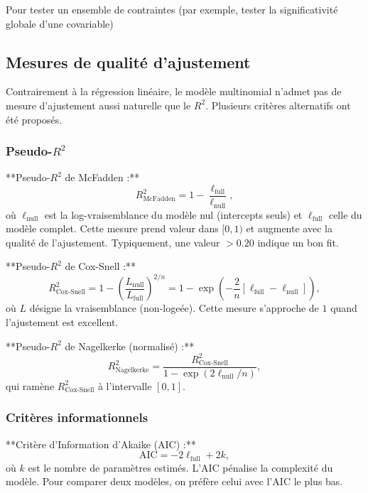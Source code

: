 \documentclass[12pt,a4paper]{article}
\begin{document}
Pour tester un ensemble de contraintes (par exemple, tester la significativité globale d'une covariable)

\subsection{Mesures de qualité d'ajustement}

Contrairement à la régression linéaire, le modèle multinomial n'admet pas de mesure d'ajustement aussi naturelle que le $R^2$. Plusieurs critères alternatifs ont été proposés.

\subsubsection{Pseudo-$R^2$}

**Pseudo-$R^2$ de McFadden :**
\begin{equation}\label{eq:r2-mcfadden}
R^2_\text{McFadden} = 1 - \frac{\ell_\text{full}}{\ell_\text{null}},
\end{equation}
où $\ell_\text{null}$ est la log-vraisemblance du modèle nul (intercepts seuls) et $\ell_\text{full}$ celle du modèle complet. Cette mesure prend valeur dans $[0,1)$ et augmente avec la qualité de l'ajustement. Typiquement, une valeur $> 0.20$ indique un bon fit.

**Pseudo-$R^2$ de Cox-Snell :**
\begin{equation}\label{eq:r2-coxsnell}
R^2_\text{Cox-Snell} = 1 - \left( \frac{L_\text{null}}{L_\text{full}} \right)^{2/n} = 1 - \exp\left( -\frac{2}{n}[\ell_\text{full} - \ell_\text{null}] \right),
\end{equation}
où $L$ désigne la vraisemblance (non-logeée). Cette mesure s'approche de $1$ quand l'ajustement est excellent.

**Pseudo-$R^2$ de Nagelkerke (normalisé) :**
\begin{equation}\label{eq:r2-nagelkerke}
R^2_\text{Nagelkerke} = \frac{R^2_\text{Cox-Snell}}{1 - \exp\left(2\ell_\text{null}/n\right)},
\end{equation}
qui ramène $R^2_\text{Cox-Snell}$ à l'intervalle $[0,1]$.

\subsubsection{Critères informationnels}

**Critère d'Information d'Akaike (AIC) :**
\begin{equation}\label{eq:aic}
\text{AIC} = -2\ell_\text{full} + 2k,
\end{equation}
où $k$ est le nombre de paramètres estimés. L'AIC pénalise la complexité du modèle. Pour comparer deux modèles, on préfère celui avec l'AIC le plus bas.
\end{document}
